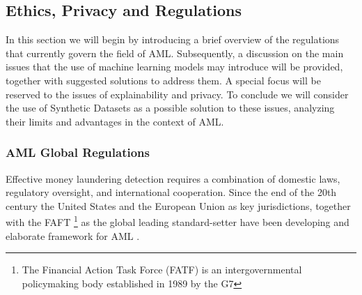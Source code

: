 \subsection{Ethics, Privacy and Regulations}
\label{ethics_privacy_regulations}
In this section we will begin by introducing a brief overview of the regulations that currently govern the field of AML.
Subsequently, a discussion on the main issues that the use of machine learning models may introduce will be provided, together with suggested solutions to address them. A special focus will be reserved to the issues of explainability and privacy.
To conclude we will consider the use of Synthetic Datasets as a possible solution to these issues, analyzing their limits and advantages in the context of AML.
\subsubsection{AML Global Regulations}
Effective money laundering detection requires a combination of domestic laws, regulatory oversight, and international cooperation. Since the end of the 20th century the United States and the European Union as key jurisdictions, together with the FAFT \footnote{The Financial Action Task Force (FATF) is an intergovernmental policymaking body established in 1989 by the G7} as the global leading standard-setter have been developing and elaborate framework for AML \cite{regulations}.

